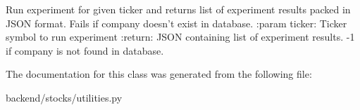 \begin{DoxyVerb}Run experiment for given ticker and returns list of experiment results
packed in JSON format.
Fails if company doesn't exist in database.
:param ticker: Ticker symbol to run experiment
:return: JSON containing list of experiment results.
 -1 if company is not found in database.
\end{DoxyVerb}
 

The documentation for this class was generated from the following file\+:\begin{DoxyCompactItemize}
\item 
backend/stocks/utilities.\+py\end{DoxyCompactItemize}
